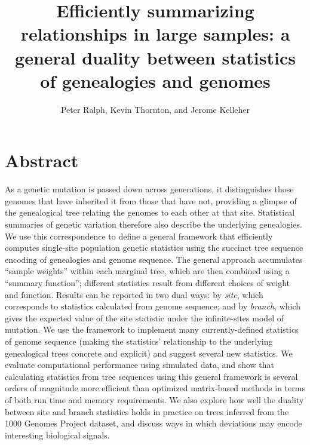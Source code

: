 \documentclass{article}
\begin{document}
\title{
    Efficiently summarizing relationships in large samples:
    a general duality between statistics of genealogies and genomes}
\author{Peter Ralph, Kevin Thornton, and Jerome Kelleher}
\maketitle



\section*{Abstract}

As a genetic mutation is passed down across generations,
it distinguishes those genomes that have inherited it from those that have not,
providing a glimpse of the genealogical tree relating the genomes to each other at that site.
Statistical summaries of genetic variation therefore also describe the underlying genealogies.
We use this correspondence to define a general framework that
efficiently computes single-site population genetic statistics
using the succinct tree sequence encoding of genealogies and genome sequence.
The general approach accumulates ``sample weights'' within each marginal tree,
which are then combined using a ``summary function'';
different statistics result from different choices of weight and function.
Results can be reported in two dual ways:
by \emph{site}, which corresponds to statistics calculated from genome
sequence; and by \emph{branch}, which gives the expected value of the site statistic
under the infinite-sites model of mutation.
We use the framework to implement many currently-defined statistics of genome
sequence (making the statistics' relationship to the underlying genealogical trees
concrete and explicit) and suggest several new statistics.
We evaluate computational performance using simulated data, and
show that calculating statistics from tree sequences using this general
framework is several orders of magnitude more efficient than
optimized matrix-based methods in terms of both run time and memory requirements.
We also explore how well the duality between site and branch statistics holds
in practice on trees inferred from the 1000 Genomes Project dataset,
and discuss ways in which deviations may encode interesting biological
signals.
\end{document}
